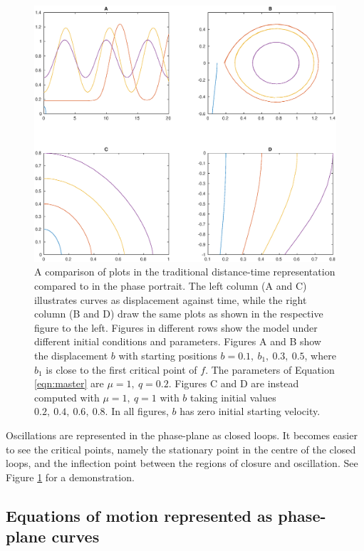 \documentclass{article}
\begin{document}
\begin{figure}
    \centering
    \includegraphics[width=\linewidth]{quadplot_phaseplane_versus_time_2}
    \caption{
        A comparison of plots in the traditional distance-time representation compared to in the phase portrait.
        The left column (A and C) illustrates curves as displacement against time, while the right column (B and D) draw the same plots as shown in the respective figure to the left.
        Figures in different rows show the model under different initial conditions and parameters.
        Figures A and B show the displacement $b$ with starting positions $b=0.1,~b_1,~0.3,~0.5$,
        where $b_1$ is close to the first critical point of $f$. The parameters of Equation \ref{eqn:master} are $\mu=1,~q=0.2$.
        Figures C and D are instead computed with $\mu=1,~q=1$ with $b$ taking initial values $0.2,~0.4,~0.6,~0.8$.
        In all figures, $b$ has zero initial starting velocity.
    }
    \label{fig:phaseportrait_compare}
\end{figure}

Oscillations are represented in the phase-plane as closed loops.
It becomes easier to see the critical points,
namely the stationary point in the centre of the closed loops,
and the inflection point between the regions of closure and oscillation.
See Figure \ref{fig:phaseportrait_compare} for a demonstration.

\subsection{Equations of motion represented as phase-plane curves}
\end{document}
